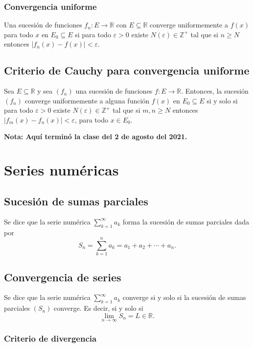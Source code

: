 \documentclass{article}
\begin{document}
\subsubsection*{Convergencia uniforme}

Una sucesión de funciones $f_n:E\to\mathbb{R}$ con $E\subseteq\mathbb{R}$ converge uniformemente a $f(x)$ para todo $x$ en $E_0\subseteq E$ si para todo $\varepsilon>0$ existe $N(\varepsilon)\in\mathbb{Z}^+$ tal que si $n\geq N$ entonces $|f_n(x)-f(x)|<\varepsilon$.

\subsection*{Criterio de Cauchy para convergencia uniforme}

Sea $E\subseteq\mathbb{R}$ y sea $(f_n)$ una sucesión de funciones $f:E\to\mathbb{R}$. Entonces, la sucesión $(f_n)$ converge uniformemente a alguna función $f(x)$ en $E_0\subseteq E$ si y solo si para todo $\varepsilon>0$ existe $N(\varepsilon)\in\mathbb{Z}^+$ tal que si $m,n\geq N$ entonces $|f_m(x)-f_n(x)|<\varepsilon$, para todo $x\in E_0$.

\vspace{10pt}
\textbf{Nota: Aquí terminó la clase del 2 de agosto del 2021.}

\section*{Series numéricas}

\subsection*{Sucesión de sumas parciales}

Se dice que la serie numérica $\displaystyle \sum_{k=1}^{\infty}a_k$ forma la sucesión de sumas parciales dada por
$$S_n=\sum_{k=1}^{n}a_k=a_1+a_2+\cdots+a_n.$$

\subsection*{Convergencia de series}

Se dice que la serie numérica $\displaystyle \sum_{k=1}^{\infty}a_k$ converge si y solo si la sucesión de sumas parciales $(S_n)$ converge. Es decir, si y solo si 
$$\lim_{n\to\infty} S_n=L\in\mathbb{R}.$$

\subsubsection*{Criterio de divergencia}
\end{document}

